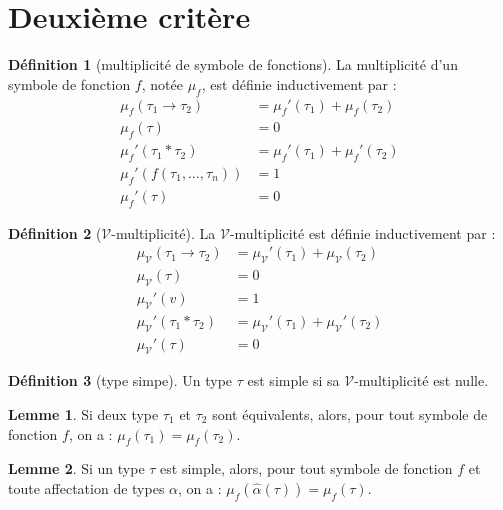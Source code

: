 \documentclass [a4paper,12pt] {article}
\theoremstyle {definition}
\newtheorem {définition} {Définition} [section]
\newtheorem {lemme} {Lemme} [section]
\newcommand {\V} {\mathscr V}
\begin{document}

\section {Deuxième critère}

\begin {définition} [multiplicité de symbole de fonctions]
	La multiplicité d'un symbole de fonction $f$, notée $\mu_f$, est définie inductivement par :
	\begin {align*}
		\mu_f (\tau_1 \rightarrow \tau_2) &= \mu_f' (\tau_1) + \mu_f (\tau_2) \\
		\mu_f (\tau) &= 0 \\
		\mu_f' (\tau_1 * \tau_2) &= \mu_f' (\tau_1) + \mu_f' (\tau_2) \\
		\mu_f' (f (\tau_1, \dots, \tau_n)) &= 1 \\
		\mu_f' (\tau) &= 0
	\end {align*}
\end {définition}

\begin {définition} [$\V$-multiplicité]
	La $\V$-multiplicité est définie inductivement par :
	\begin {align*}
		\mu_\V (\tau_1 \rightarrow \tau_2) &= \mu_\V' (\tau_1) + \mu_\V (\tau_2) \\
		\mu_\V (\tau) &= 0 \\
		\mu_\V' (v) &= 1 \\
		\mu_\V' (\tau_1 * \tau_2) &= \mu_\V' (\tau_1) + \mu_\V' (\tau_2) \\
		\mu_\V' (\tau) &= 0
	\end {align*}
\end {définition}

\begin {définition} [type simpe]
	Un type $\tau$ est simple si sa $\V$-multiplicité est nulle.
\end {définition}

\begin {lemme} \label {mu-=E}
	Si deux type $\tau_1$ et $\tau_2$ sont équivalents, alors, pour tout symbole de fonction $f$, on a : $\mu_f (\tau_1) = \mu_f (\tau_2)$.
\end {lemme}

\begin {lemme} \label {mu-subst-simple}
	Si un type $\tau$ est simple, alors, pour tout symbole de fonction $f$ et toute affectation de types $\alpha$, on a : $\mu_f (\hat \alpha (\tau)) = \mu_f (\tau)$.
\end {lemme}
\end{document}

